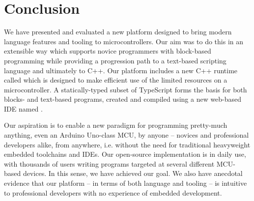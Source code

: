 \section{Conclusion}
\label{sec:conclude}

We have presented and evaluated a new platform designed to bring modern language features and tooling to microcontrollers. Our aim was to do this in an extensible way which supports novice programmers with block-based programming while providing a progression path to a text-based scripting language and ultimately to C++. Our platform includes a new C++ runtime called \CO which is designed to make efficient use of the limited resources on a microcontroller. A statically-typed subset of TypeScript forms the basis for both blocks- and text-based programs, created and compiled using a new web-based IDE named \MC.

Our aspiration is to enable a new paradigm for programming pretty-much anything, even an Arduino Uno-class MCU, by anyone -- novices and professional developers alike, from anywhere, i.e. without the need for traditional heavyweight embedded toolchains and IDEs. Our open-source implementation is in daily use, with thousands of users writing programs targeted at several different MCU-based devices. In this sense, we have achieved our goal. We also have anecdotal evidence that our platform -- in terms of both language and tooling -- is intuitive to professional developers with no experience of embedded development. 
